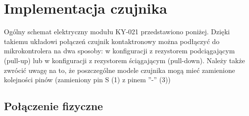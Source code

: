 \documentclass[11pt, a4paper]{article}
\begin{document}
\section{Implementacja czujnika}
Ogólny schemat elektryczny modułu KY-021 przedstawiono poniżej. Dzięki takiemu układowi połączeń czujnik kontaktronowy można podłączyć do mikrokontrolera na dwa sposoby: w konfiguracji z rezystorem podciągającym (pull-up) lub w konfiguracji z rezystorem ściągającym (pull-down). Należy także zwrócić uwagę na to, że poszczególne modele czujnika mogą mieć zamienione kolejności pinów (zamieniony pin S (1) z pinem ''-'' (3))

\subsection{Połączenie fizyczne}
\end{document}
